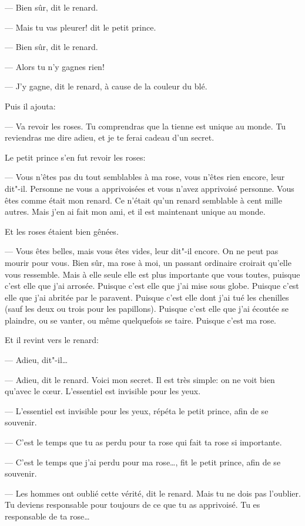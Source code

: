 \begin{Parallel}[p]{}{}
{--- Bien sûr, dit le renard.

--- Mais tu vas pleurer! dit le petit prince.

--- Bien sûr, dit le renard.

--- Alors tu n'y gagnes rien!

--- J'y gagne, dit le renard, à cause de la couleur du blé.

Puis il ajouta:

--- Va revoir les roses. Tu comprendras que la
tienne est unique au monde. Tu reviendras me dire
adieu, et je te ferai cadeau d'un secret.

\medskip

Le petit prince s'en fut revoir les roses:

--- Vous n'êtes pas du tout semblables à ma rose,
vous n'êtes rien encore, leur dit"-il. Personne ne vous a
apprivoisées et vous n'avez apprivoisé personne.
Vous êtes comme était mon renard. Ce n'était qu'un
renard semblable à cent mille autres. Mais j'en ai
fait mon ami, et il est maintenant unique au monde.

Et les roses étaient bien gênées.

--- Vous êtes belles, mais vous êtes vides, leur dit"-il
encore. On ne peut pas mourir pour vous. Bien sûr,
ma rose à moi, un passant ordinaire croirait qu'elle
vous ressemble. Mais à elle seule elle est plus importante que vous toutes, puisque c'est elle que j'ai
arrosée. Puisque c'est elle que j'ai mise sous globe.
Puisque c'est elle que j'ai abritée par le paravent.
Puisque c'est elle dont j'ai tué les chenilles (sauf les
deux ou trois pour les papillons). Puisque c'est elle
que j'ai écoutée se plaindre, ou se vanter, ou même
quelquefois se taire. Puisque c'est ma rose.

\medskip

Et il revint vers le renard:

--- Adieu, dit"-il\ldots{}

--- Adieu, dit le renard. Voici mon secret. Il est
très simple: on ne voit bien qu'avec le cœur. L'essentiel est invisible pour les yeux.

--- L'essentiel est invisible pour les yeux, répéta le
petit prince, afin de se souvenir.

--- C'est le temps que tu as perdu pour ta rose qui
fait ta rose si importante.

--- C'est le temps que j'ai perdu pour ma rose\ldots{},
fit le petit prince, afin de se souvenir.

--- Les hommes ont oublié cette vérité, dit le
renard. Mais tu ne dois pas l'oublier. Tu deviens responsable pour toujours de ce que tu as apprivoisé.
Tu es responsable de ta rose\ldots{}

}
\end{Parallel}
